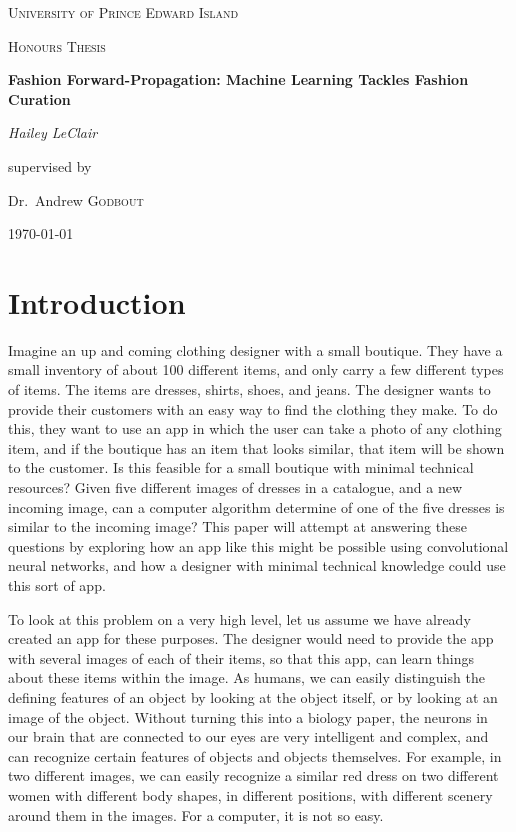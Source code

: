 \documentclass[12pt]{report} %
\begin{document}
\begin{titlepage}
\centering
    {\scshape\LARGE University of Prince Edward Island\par}
    \vspace{1cm}
    {\scshape\Large Honours Thesis\par}
    \vspace{1.5cm}
    {\huge\bfseries Fashion Forward-Propagation: Machine Learning Tackles Fashion Curation\par}
    \vspace{2cm}
    {\Large\itshape Hailey LeClair\par}
    \vfill
    supervised by\par
    Dr.~Andrew \textsc{Godbout}

\vfill

\today\par

\end{titlepage}
\tableofcontents
\newpage
\listoffigures
\newpage


\chapter{Introduction}
	Imagine an up and coming clothing designer with a small boutique. They have a small inventory of about 100 different items, and only carry a few different types of items. The items are dresses, shirts, shoes, and jeans. The designer wants to provide their customers with an easy way to find the clothing they make. To do this, they want to use an app in which the user can take a photo of any clothing item, and if the boutique has an item that looks similar, that item will be shown to the customer. Is this feasible for a small boutique with minimal technical resources? Given five different images of dresses in a catalogue, and a new incoming image, can a computer algorithm determine of one of the five dresses is similar to the incoming image? This paper will attempt at answering these questions by exploring how an app like this might be possible using convolutional neural networks, and how a designer with minimal technical knowledge could use this sort of app.
	
	To look at this problem on a very high level, let us assume we have already created an app for these purposes. The designer would need to provide the app with several images of each of their items, so that this app, can learn things about these items within the image. As humans, we can easily distinguish the defining features of an object by looking at the object itself, or by looking at an image of the object. Without turning this into a biology paper, the neurons in our brain that are connected to our eyes are very intelligent and complex, and can recognize certain features of objects and objects themselves\cite{aurelienMachineLearning}. For example, in two different images, we can easily recognize a similar red dress on two different women with different body shapes, in different positions, with different scenery around them in the images. For a computer, it is not so easy. 
	
\end{document}
